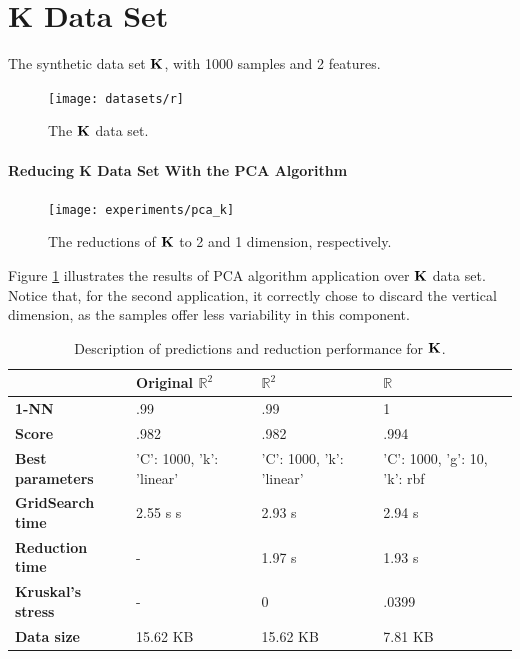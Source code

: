 \section{K Data Set}
\label{experiments:k}

The synthetic data set $\mathbf{K}$, with 1000 samples and 2 features.
\newline\newline

\begin{figure}[H]
	\centering
	\captionsetup{justification=centering}
	\texttt{[image: datasets/r]}
	\caption{The $\mathbf{K}$ data set.}
\end{figure}

\newpage
\paragraph{Reducing K Data Set With the PCA Algorithm}

\begin{figure}[H]
	\centering
	\captionsetup{justification=centering}
	
	\texttt{[image: experiments/pca\_k]}
	\caption{The reductions of $\mathbf{K}$ to 2 and 1 dimension, respectively.}
	\label{fig:dsrpca}
\end{figure}

Figure \ref{fig:dsrpca} illustrates the results of PCA algorithm application over $\mathbf{K}$ data set. Notice that, for the second application, it correctly chose to discard the vertical dimension, as the samples offer less variability in this component.

\begin{table}[H]
	\centering
	\begin{tabular}{|p{.25\linewidth}|p{.20\linewidth}|p{.20\linewidth}|p{.20\linewidth}|}
		\hline
		& \textbf{Original $\mathbb{R}^2$} & \textbf{$\mathbb{R}^2$} & \textbf{$\mathbb{R}$} \\\hline
		\textbf{1-NN} & .99 & .99 & 1 \\\hline
		\textbf{Score} & .982 & .982 & .994 \\\hline
		\textbf{Best parameters} & 'C': 1000, 'k': 'linear' & 'C': 1000, 'k': 'linear' & 'C': 1000, 'g': 10, 'k': rbf \\\hline
		\textbf{GridSearch time} & 2.55 s s & 2.93 s & 2.94 s \\\hline
		\textbf{Reduction time} & - & 1.97 s & 1.93 s \\\hline
		\textbf{Kruskal's stress} & - & 0 & .0399 \\\hline
		\textbf{Data size} & 15.62 KB & 15.62 KB & 7.81 KB \\\hline
	\end{tabular}
	\captionsetup{justification=centering}
	\caption{Description of predictions and reduction performance for $\mathbf{K}$.}
\end{table}

